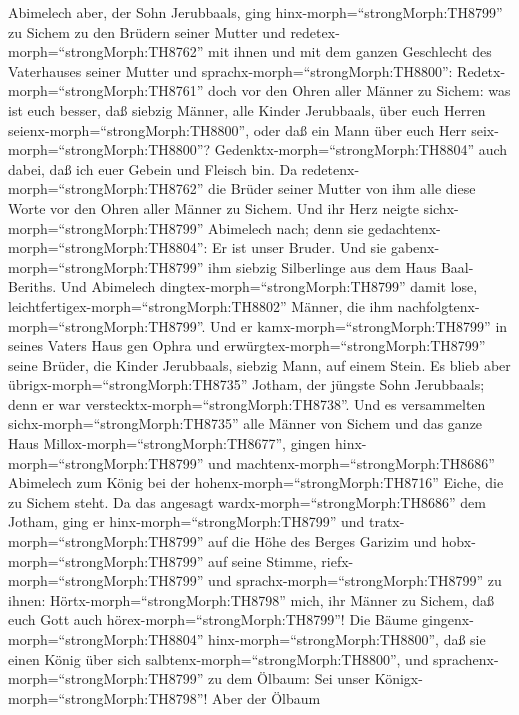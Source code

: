  Abimelech aber, der Sohn Jerubbaals, ging
hinx-morph=``strongMorph:TH8799'' zu Sichem zu den Brüdern seiner Mutter
und redetex-morph=``strongMorph:TH8762'' mit ihnen und mit dem ganzen
Geschlecht des Vaterhauses seiner Mutter und
sprachx-morph=``strongMorph:TH8800'': 
Redetx-morph=``strongMorph:TH8761'' doch vor den Ohren aller Männer zu
Sichem: was ist euch besser, daß siebzig Männer, alle Kinder Jerubbaals,
über euch Herren seienx-morph=``strongMorph:TH8800'', oder daß ein Mann
über euch Herr seix-morph=``strongMorph:TH8800''?
Gedenktx-morph=``strongMorph:TH8804'' auch dabei, daß ich euer Gebein
und Fleisch bin.  Da redetenx-morph=``strongMorph:TH8762''
die Brüder seiner Mutter von ihm alle diese Worte vor den Ohren aller
Männer zu Sichem. Und ihr Herz neigte sichx-morph=``strongMorph:TH8799''
Abimelech nach; denn sie gedachtenx-morph=``strongMorph:TH8804'': Er ist
unser Bruder.  Und sie gabenx-morph=``strongMorph:TH8799''
ihm siebzig Silberlinge aus dem Haus Baal-Beriths. Und Abimelech
dingtex-morph=``strongMorph:TH8799'' damit lose,
leichtfertigex-morph=``strongMorph:TH8802'' Männer, die ihm
nachfolgtenx-morph=``strongMorph:TH8799''.  Und er
kamx-morph=``strongMorph:TH8799'' in seines Vaters Haus gen Ophra und
erwürgtex-morph=``strongMorph:TH8799'' seine Brüder, die Kinder
Jerubbaals, siebzig Mann, auf einem Stein. Es blieb aber
übrigx-morph=``strongMorph:TH8735'' Jotham, der jüngste Sohn Jerubbaals;
denn er war verstecktx-morph=``strongMorph:TH8738''.  Und es
versammelten sichx-morph=``strongMorph:TH8735'' alle Männer von Sichem
und das ganze Haus Millox-morph=``strongMorph:TH8677'', gingen
hinx-morph=``strongMorph:TH8799'' und
machtenx-morph=``strongMorph:TH8686'' Abimelech zum König bei der
hohenx-morph=``strongMorph:TH8716'' Eiche, die zu Sichem steht.
 Da das angesagt wardx-morph=``strongMorph:TH8686'' dem
Jotham, ging er hinx-morph=``strongMorph:TH8799'' und
tratx-morph=``strongMorph:TH8799'' auf die Höhe des Berges Garizim und
hobx-morph=``strongMorph:TH8799'' auf seine Stimme,
riefx-morph=``strongMorph:TH8799'' und
sprachx-morph=``strongMorph:TH8799'' zu ihnen:
Hörtx-morph=``strongMorph:TH8798'' mich, ihr Männer zu Sichem, daß euch
Gott auch hörex-morph=``strongMorph:TH8799''!  Die Bäume
gingenx-morph=``strongMorph:TH8804'' hinx-morph=``strongMorph:TH8800'',
daß sie einen König über sich salbtenx-morph=``strongMorph:TH8800'', und
sprachenx-morph=``strongMorph:TH8799'' zu dem Ölbaum: Sei unser
Königx-morph=``strongMorph:TH8798''!  Aber der Ölbaum
